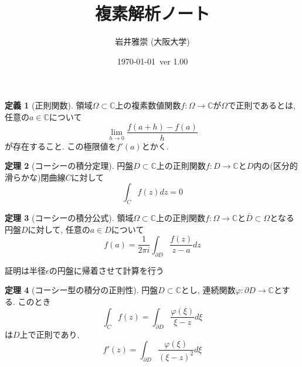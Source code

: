 \documentclass[dvipdfmx,a4paper,11pt]{article}
\title{複素解析ノート}
\author{岩井雅崇 (大阪大学)}
\date{\today \, ver 1.00}
\newcommand{\C}{\mathbb{C}}
\theoremstyle{definition}
\newtheorem{thm}{定理}
\newtheorem{dfn}[thm]{定義}
\begin{document}
\maketitle

\section{}



  \begin{tcolorbox}[
    colback = white,
    colframe = green!35!black,
    fonttitle = \bfseries,
    breakable = true]
    \begin{dfn}[正則関数]
領域$\Omega \subset \C$上の複素数値関数$f : \Omega \rightarrow \C$が$\Omega$で正則であるとは, 任意の$a \in \C$について
$$\lim_{h\rightarrow 0} \frac{f(a+h) - f(a)}{h}$$
が存在すること. この極限値を$f'(a)$とかく.
    \end{dfn}
    \end{tcolorbox}
    
      \begin{tcolorbox}[
    colback = white,
    colframe = green!35!black,
    fonttitle = \bfseries,
    breakable = true]
    \begin{thm}[コーシーの積分定理]
円盤$D \subset \C$上の正則関数$f : D\rightarrow \C$と$D$内の(区分的滑らかな)閉曲線$C$に対して
$$\int_{C}f(z) dz =0$$
    \end{thm}
    \end{tcolorbox}
    
       \begin{tcolorbox}[
    colback = white,
    colframe = green!35!black,
    fonttitle = \bfseries,
    breakable = true]
    \begin{thm}[コーシーの積分公式]
領域$\Omega \subset \C$上の正則関数$f : \Omega \rightarrow \C$と$\bar{D} \subset \Omega$となる円盤$D$に対して, 任意の$a \in D$について
$$f(a) = \frac{1}{2 \pi i} \int_{\partial D} \frac{f(z)}{z - a} dz$$
    \end{thm}
    \end{tcolorbox}
  証明は半径$\epsilon$の円盤に帰着させて計算を行う

       \begin{tcolorbox}[
    colback = white,
    colframe = green!35!black,
    fonttitle = \bfseries,
    breakable = true]
    \begin{thm}[コーシー型の積分の正則性]
円盤$D \subset \C$とし, 連続関数$\varphi : \partial D \rightarrow \C$とする. このとき
$$\int_{C}f(z) =  \int_{\partial D} \frac{ \varphi ( \xi)}{\xi - z } d\xi$$
は$D$上で正則であり, 
$$
f'(z) =  \int_{\partial D} \frac{ \varphi ( \xi)}{(\xi - z)^2 } d\xi
$$
    \end{thm}
    \end{tcolorbox}
    
\end{document}
